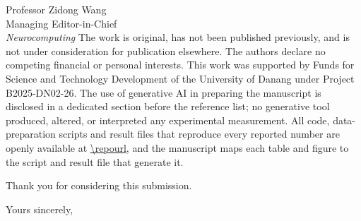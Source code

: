 \documentclass[11pt]{letter}
\newcommand{\repolink}{\expandafter\url\expandafter{\repourl}}
\begin{document}
\begin{letter}{Professor Zidong Wang\\Managing Editor-in-Chief\\\emph{Neurocomputing}}
The work is original, has not been published previously, and is not under consideration for
publication elsewhere. The authors declare no competing financial or personal interests. This
work was supported by Funds for Science and Technology Development of the University of Danang
under Project B2025-DN02-26. The use of generative AI in preparing the manuscript is disclosed in a
dedicated section before the reference list; no generative tool produced, altered, or
interpreted any experimental measurement. All code, data-preparation scripts and result files
that reproduce every reported number are openly available at \repolink, and the manuscript maps
each table and figure to the script and result file that generate it.

Thank you for considering this submission.

\closing{Yours sincerely,}
\end{letter}
\end{document}
